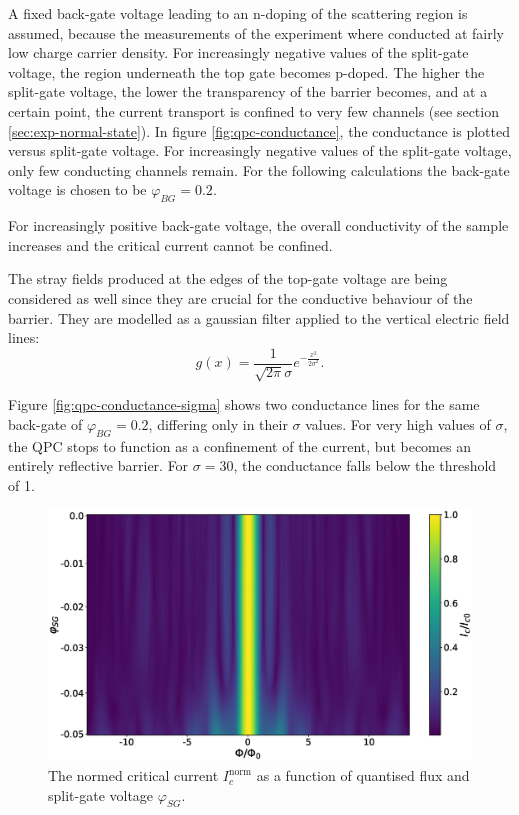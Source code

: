 A fixed back-gate voltage leading to an n-doping of the scattering region is assumed, because the measurements of the experiment where conducted at fairly low charge carrier density. For increasingly negative values of the split-gate voltage, the region underneath the top gate becomes p-doped. The higher the split-gate voltage, the lower the transparency of the barrier becomes, and at a certain point, the current transport is confined to very few channels (see section \ref{sec:exp-normal-state}). In figure \ref{fig:qpc-conductance}, the conductance is plotted versus split-gate voltage. For increasingly negative values of the split-gate voltage, only few conducting channels remain. For the following calculations the back-gate voltage is chosen to be $\varphi_{BG} = 0.2$.

For increasingly positive back-gate voltage, the overall conductivity of the sample increases and the critical current cannot be confined.

The stray fields produced at the edges of the top-gate voltage are being considered as well since they are crucial for the conductive behaviour of the barrier. They are modelled as a gaussian filter applied to the vertical electric field lines:
\begin{equation}
g (x) = \frac{1}{\sqrt{2 \pi} \sigma} e^{-\frac{x^2}{2 \sigma ^2}}.
\end{equation}

Figure \ref{fig:qpc-conductance-sigma} shows two conductance lines for the same back-gate of $\varphi_{BG} = 0.2$, differing only in their $\sigma$ values. For very high values of $\sigma$, the QPC stops to function as a confinement of the current, but becomes an entirely reflective barrier. For $\sigma = 30$, the conductance falls below the threshold of 1.

\begin{figure}[h]
\includegraphics[width=\textwidth]{figure/numericalmodel/qpc_icnorm_heatmap}
\caption{The normed critical current $I_c^\text{norm}$ as a function of quantised flux and split-gate voltage $\varphi_{SG}$. }\label{fig:qpc-heatmap}
\end{figure}

